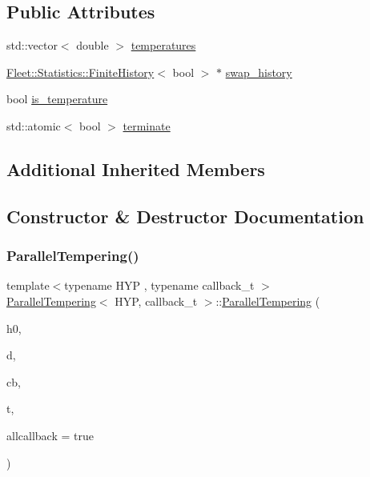 \subsection*{Public Attributes}
\begin{DoxyCompactItemize}
\item 
std\+::vector$<$ double $>$ \hyperlink{class_parallel_tempering_a5aca1e6ca522986f183d61c91c94d21d}{temperatures}
\item 
\hyperlink{class_fleet_1_1_statistics_1_1_finite_history}{Fleet\+::\+Statistics\+::\+Finite\+History}$<$ bool $>$ $\ast$ \hyperlink{class_parallel_tempering_a86a7b77250a04b5df502f1c770cf51bf}{swap\+\_\+history}
\item 
bool \hyperlink{class_parallel_tempering_ae9f0a2af938df838cc4010983860394e}{is\+\_\+temperature}
\item 
std\+::atomic$<$ bool $>$ \hyperlink{class_parallel_tempering_acda523b375468743e7d8ac471af65285}{terminate}
\end{DoxyCompactItemize}
\subsection*{Additional Inherited Members}


\subsection{Constructor \& Destructor Documentation}
\mbox{\label{class_parallel_tempering_aec98f6abe3a51a3cf79b508ba176d290}} 
\subsubsection{\texorpdfstring{Parallel\+Tempering()}{ParallelTempering()}\hspace{0.1cm}{\footnotesize\ttfamily [1/3]}}
{\footnotesize\ttfamily template$<$typename H\+YP , typename callback\+\_\+t $>$ \\
\hyperlink{class_parallel_tempering}{Parallel\+Tempering}$<$ H\+YP, callback\+\_\+t $>$\+::\hyperlink{class_parallel_tempering}{Parallel\+Tempering} (\begin{DoxyParamCaption}\item[{H\+YP \&}]{h0,  }\item[{typename H\+Y\+P\+::data\+\_\+t $\ast$}]{d,  }\item[{callback\+\_\+t \&}]{cb,  }\item[{std\+::initializer\+\_\+list$<$ double $>$}]{t,  }\item[{bool}]{allcallback = {\ttfamily true} }\end{DoxyParamCaption})\hspace{0.3cm}{\ttfamily [inline]}}


